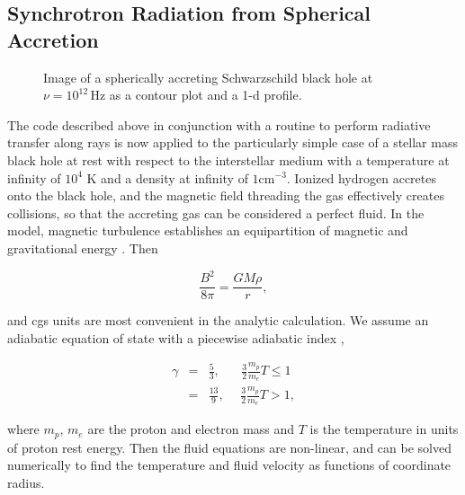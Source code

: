 \documentclass[apj]{emulateapj}
\begin{document}
\subsection{Synchrotron Radiation from Spherical Accretion}

\begin{figure}[ht!]
\begin{center}
\caption{\label{imgs} Image of a spherically accreting Schwarzschild black hole at $\nu = 10^{12} \hspace{2pt} \mathrm{Hz}$ as a contour plot and a 1-d profile.}
\end{center}
\end{figure}

The code described above in conjunction with a routine to perform radiative transfer along rays is now applied to the particularly simple case of a stellar mass black hole at rest with respect to the interstellar medium with a temperature at infinity of $10^4$ K and a density at infinity of $1 \mathrm{cm}^{-3}$. Ionized hydrogen accretes onto the black hole, and the magnetic field threading the gas effectively creates collisions, so that the accreting gas can be considered a perfect fluid. In the model, magnetic turbulence establishes an equipartition of magnetic and gravitational energy \citep{zelnov}. Then 

\begin{equation}
  \frac{B^2}{8\pi} = \frac{GM\rho}{r},
\end{equation}

\noindent and cgs units are most convenient in the analytic calculation. We assume an adiabatic equation of state with a piecewise adiabatic index \citep{shapbook}, 

\begin{eqnarray}
\gamma &=& \frac{5}{3},\hspace{20pt} \frac{3}{2} \frac{m_p}{m_e}T \leq 1\nonumber \\
       &=& \frac{13}{9},\hspace{15pt} \frac{3}{2} \frac{m_p}{m_e}T > 1,
\end{eqnarray}

\noindent where $m_p$, $m_e$ are the proton and electron mass and $T$ is the temperature in units of proton rest energy. Then the fluid equations are non-linear, and can be solved numerically \citep{michel} to find the temperature and fluid velocity as functions of coordinate radius.
\end{document}
